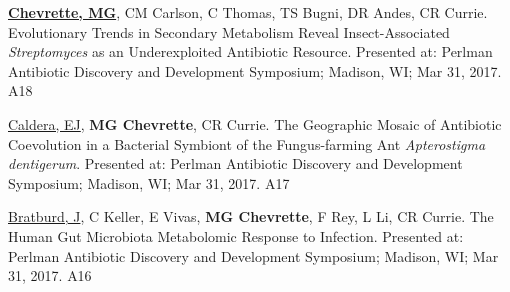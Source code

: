 

\begin{cvpubs}

  \cvpub
    {\underline{\textbf{Chevrette, MG}}, CM Carlson, C Thomas, TS Bugni, DR Andes, CR Currie.  Evolutionary Trends in Secondary Metabolism Reveal Insect-Associated \textit{Streptomyces} as an Underexploited Antibiotic Resource.  Presented at: Perlman Antibiotic Discovery and Development Symposium; Madison, WI; Mar 31, 2017.} %
    {A18} %

  \cvpub
    {\underline{Caldera, EJ}, \textbf{MG Chevrette}, CR Currie.  The Geographic Mosaic of Antibiotic Coevolution in a Bacterial Symbiont of the Fungus-farming Ant \textit{Apterostigma dentigerum}.  Presented at: Perlman Antibiotic Discovery and Development Symposium; Madison, WI; Mar 31, 2017.} %
    {A17} %

  \cvpub
    {\underline{Bratburd, J}, C Keller, E Vivas, \textbf{MG Chevrette}, F Rey, L Li, CR Currie.  The Human Gut Microbiota Metabolomic Response to Infection.  Presented at: Perlman Antibiotic Discovery and Development Symposium; Madison, WI; Mar 31, 2017.} %
    {A16} %
    
\end{cvpubs}
